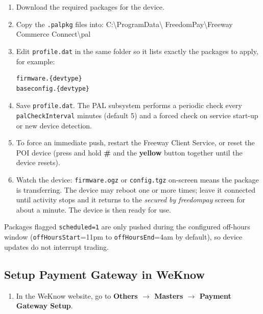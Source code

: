 \documentclass[a4paper,10pt]{article}
\begin{document}
\begin{enumerate}
  \item Download the required packages for the device.
  \item Copy the \texttt{.palpkg} files into:\newline
        {\ttfamily C:\textbackslash ProgramData\textbackslash
        FreedomPay\textbackslash Freeway Commerce
        Connect\textbackslash pal}
  \item Edit \texttt{profile.dat} in the same folder so it lists exactly
        the packages to apply, for example:
\begin{lstlisting}
firmware.{devtype}
baseconfig.{devtype}
\end{lstlisting}
  \item Save \texttt{profile.dat}. The PAL subsystem performs a periodic
        check every \texttt{palCheckInterval} minutes (default 5) and a
        forced check on service start-up or new device detection.
  \item To force an immediate push, restart the Freeway Client Service,
        or reset the POI device (press and hold \textbf{\#} and the
        \textbf{yellow} button together until the device resets).
  \item Watch the device: \texttt{firmware.ogz} or \texttt{config.tgz}
        on-screen means the package is transferring. The device may
        reboot one or more times; leave it connected until activity
        stops and it returns to the \emph{secured by freedompay} screen
        for about a minute. The device is then ready for use.
\end{enumerate}

\begin{wkinfo}
Packages flagged \texttt{scheduled=1} are only pushed during the
configured off-hours window (\texttt{offHoursStart}=11pm to
\texttt{offHoursEnd}=4am by default), so device updates do not interrupt
trading.
\end{wkinfo}

\subsection{Setup Payment Gateway in WeKnow}

\begin{enumerate}
  \item In the WeKnow website, go to \textbf{Others $\rightarrow$ Masters
        $\rightarrow$ Payment Gateway Setup}.
\end{enumerate}
\end{document}

